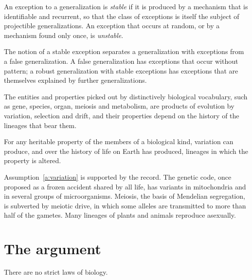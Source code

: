 \documentclass{situationist-preprint}
\begin{document}
\begin{definition}\label{d:stable}
An exception to a generalization is \emph{stable} if it is produced by a mechanism that is identifiable and recurrent, so that the class of exceptions is itself the subject of projectible generalizations. An exception that occurs at random, or by a mechanism found only once, is \emph{unstable}.
\end{definition}

The notion of a stable exception separates a generalization with exceptions from a false generalization. A false generalization has exceptions that occur without pattern; a robust generalization with stable exceptions has exceptions that are themselves explained by further generalizations.

\begin{assumption}\label{a:origin}
The entities and properties picked out by distinctively biological vocabulary, such as gene, species, organ, meiosis and metabolism, are products of evolution by variation, selection and drift, and their properties depend on the history of the lineages that bear them.
\end{assumption}

\begin{assumption}[Variation]\label{a:variation}
For any heritable property of the members of a biological kind, variation can produce, and over the history of life on Earth has produced, lineages in which the property is altered.
\end{assumption}

Assumption~\ref{a:variation} is supported by the record. The genetic code, once proposed as a frozen accident shared by all life, has variants in mitochondria and in several groups of microorganisms. Meiosis, the basis of Mendelian segregation, is subverted by meiotic drive, in which some alleles are transmitted to more than half of the gametes. Many lineages of plants and animals reproduce asexually.

\section{The argument}\label{s:argument}

\begin{theorem}\label{t:nolaws}
There are no strict laws of biology.
\end{theorem}
\end{document}
